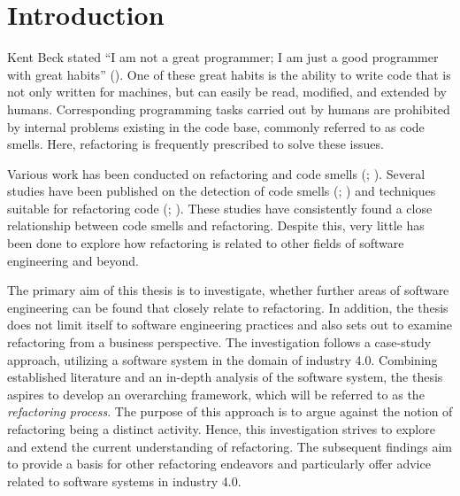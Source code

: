 \chapter{Introduction}
Kent Beck stated “I am not a great programmer; I am just a good programmer with great habits” (\cite{fowler2012}). One of these great habits is the ability to write code that is not only written for machines, but can easily be read, modified, and extended by humans. Corresponding programming tasks carried out by humans are prohibited by internal problems existing in the code base, commonly referred to as code smells. Here, refactoring is frequently prescribed to solve these issues. 

Various work has been conducted on refactoring and code smells (\cite{fowler2018}; \cite{lacerda2020}). Several studies have been published on the detection of code smells (\cite{chen2016}; \cite{menshawy2021}) and techniques suitable for refactoring code (\cite{fowler2018}; \cite{mens2004}). These studies have consistently found a close relationship between code smells and refactoring. Despite this, very little has been done to explore how refactoring is related to other fields of software engineering and beyond.

The primary aim of this thesis is to investigate, whether further areas of software engineering can be found that closely relate to refactoring. In addition, the thesis does not limit itself to software engineering practices and also sets out to examine refactoring from a business perspective. The investigation follows a case-study approach, utilizing a software system in the domain of industry 4.0. Combining established literature and an in-depth analysis of the software system, the thesis aspires to develop an overarching framework, which will be referred to as the \emph{refactoring process}. The purpose of this approach is to argue against the notion of refactoring being a distinct activity. Hence, this investigation strives to explore and extend the current understanding of refactoring. The subsequent findings aim to provide a basis for other refactoring endeavors and particularly offer advice related to software systems in industry 4.0.

